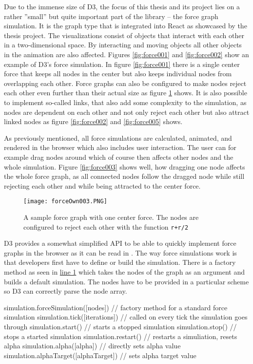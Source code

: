 Due to the immense size of D3, the focus of this thesis and its project lies on a rather ''small'' but quite important part of the library -- the force graph simulation. It is the graph type that is integrated into React as showcased by the thesis project. The visualizations consist of objects that interact with each other in a two-dimensional space. By interacting and moving objects all other objects in the animation are also affected. Figures \ref{fig:force001} and \ref{fig:force002} show an example of D3's force simulation. In figure \ref{fig:force001} there is a single center force that keeps all nodes in the center but also keeps individual nodes from overlapping each other. Force graphs can also be configured to make nodes reject each other even further than their actual size as figure \ref{fig:force004} shows. It is also possible to implement so-called links, that also add some complexity to the simulation, as nodes are dependent on each other and not only reject each other but also attract linked nodes as figure \ref{fig:force002} and \ref{fig:force005} shows.

As previously mentioned, all force simulations are calculated, animated, and rendered in the browser which also includes user interaction. The user can for example drag nodes around which of course then affects other nodes and the whole simulation. Figure \ref{fig:force003} shows well, how dragging one node affects the whole force graph, as all connected nodes follow the dragged node while still rejecting each other and while being attracted to the center force.

\begin{figure}
  \centering
  \texttt{[image: forceOwn003.PNG]}
  \caption{A sample force graph with one center force. The nodes are configured to reject each other with the function \texttt{r+r/2}}
  \label{fig:force004}
\end{figure}

D3 provides a somewhat simplified API to be able to quickly implement force graphs in the browser as it can be read in \cite[/d3-force/blob/master/README.md]{D3Github}. The way force simulations work is that developers first have to define or build the simulation. There is a factory method as seen in \hyperref[prog:simulation]{line 1} which takes the nodes of the graph as an argument and builds a default simulation. The nodes have to be provided in a particular scheme so D3 can correctly parse the node array. 

\begin{program}
\caption{Code snippets for D3 force simulation code}
\label{prog:simulation}
\begin{JsCode}
simulation.forceSimulation([nodes]) // factory method for a standard force simulation
simulation.tick([iterations]) // called on every tick the simulation goes through
simulation.start() // starts a stopped simulation
simulation.stop() // stops a started simulation
simulation.restart() // restarts a simuliation, resets alpha
simulation.alpha([alpha]) // directly sets alpha value
simulation.alphaTarget([alphaTarget]) // sets alpha target value
\end{JsCode}
\end{program}

